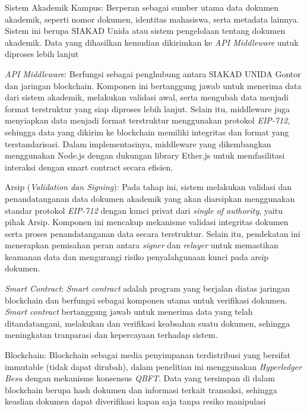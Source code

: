 		\begin{subsecenumerate}
			\item Sistem Akademik Kampus: Berperan sebagai sumber utama data dokumen akademik, seperti nomor dokumen, identitas mahasiswa, serta metadata lainnya. Sistem ini berupa SIAKAD Unida atau sistem pengelolaan tentang dokumen akademik. Data yang dihasilkan kemudian dikirimkan ke \textit{API Middleware} untuk diproses lebih lanjut
			\item \textit{API Middleware}: Berfungsi sebagai penghubung antara SIAKAD UNIDA Gontor dan jaringan blockchain. Komponen ini bertanggung jawab untuk menerima data dari sistem akademik, melakukan validasi awal, serta mengubah data menjadi format terstruktur yang siap diproses lebih lanjut. Selain itu, middleware juga menyiapkan data menjadi format terstruktur menggunakan protokol \textit{EIP-712}, sehingga data yang dikirim ke blockchain memiliki integritas dan format yang terstandarisasi. Dalam implementasinya, middleware yang dikembangkan menggunakan Node.js dengan dukungan library Ether.js untuk memfasilitasi interaksi dengan smart contract secara efisien.
			\item Arsip (\textit{Validation dan Signing}): Pada tahap ini, sistem melakukan validasi dan penandatanganan data dokumen akademik yang akan diarsipkan menggunakan standar protokol \textit{EIP-712} dengan kunci privat dari \textit{single of authority}, yaitu pihak Arsip. Komponen ini mencakup mekanisme validasi integritas dokumen serta proses penandatanganan data secara terstruktur. Selain itu, pendekatan ini menerapkan pemisahan peran antara \textit{signer} dan \textit{relayer} untuk memastikan keamanan data dan mengurangi risiko penyalahgunaan kunci pada arsip dokumen.
			\item \textit{Smart Contract}: \textit{Smart contract} adalah program yang berjalan diatas jaringan blockchain dan berfungsi sebagai komponen utama untuk verifikasi dokumen. \textit{Smart contract} bertanggung jawab untuk menerima data yang telah ditandatangani, melakukan dan verifikasi keabsahan suatu dokumen, sehingga meningkatan tranparasi dan kepercayaan terhadap sistem. 
			\item Blockchain: Blockchain sebagai media penyimpanan terdistribusi yang bersifat immutable (tidak dapat dirubah), dalam penelitian ini menggunakan \textit{Hyperledger Besu} dengan mekanisme konsensus \textit{QBFT}. Data yang tersimpan di dalam blockchain berupa hash dokumen dan informasi terkait transaksi, sehingga keaslian dokumen dapat diverifikasi kapan saja tanpa resiko manipulasi  
		\end{subsecenumerate}
		
